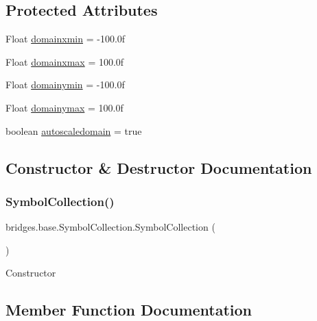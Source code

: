 \subsection*{Protected Attributes}
\begin{DoxyCompactItemize}
\item 
Float \hyperlink{classbridges_1_1base_1_1_symbol_collection_a808f462a3da6890685739ea62e87abae}{domainxmin} = -\/100.\+0f
\item 
Float \hyperlink{classbridges_1_1base_1_1_symbol_collection_a1b65abde241d7659588601d919670cd2}{domainxmax} = 100.\+0f
\item 
Float \hyperlink{classbridges_1_1base_1_1_symbol_collection_a38859e6dad1904650267a0a32d49e65f}{domainymin} = -\/100.\+0f
\item 
Float \hyperlink{classbridges_1_1base_1_1_symbol_collection_acd92edee421384e0c044a67145df8a8b}{domainymax} = 100.\+0f
\item 
boolean \hyperlink{classbridges_1_1base_1_1_symbol_collection_ab7f055b5525eda8fc4056244999c739d}{autoscaledomain} = true
\end{DoxyCompactItemize}


\subsection{Constructor \& Destructor Documentation}
\mbox{\label{classbridges_1_1base_1_1_symbol_collection_a8959dab963ce54f56560c6c27a3a3de5}} 
\subsubsection{\texorpdfstring{Symbol\+Collection()}{SymbolCollection()}}
{\footnotesize\ttfamily bridges.\+base.\+Symbol\+Collection.\+Symbol\+Collection (\begin{DoxyParamCaption}{ }\end{DoxyParamCaption})}

Constructor 

\subsection{Member Function Documentation}
\mbox{\label{classbridges_1_1base_1_1_symbol_collection_a8e934c53b78b05a7e982f3ff2362adea}} 
